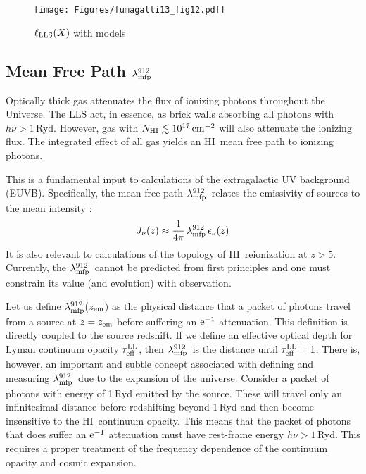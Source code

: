 \documentclass[graybox]{svmult}
\newcommand{\HI}{H{\sc I}}
\newcommand{\mnhi}{N_{\rm HI}}
\def\cm#1{\, {\rm cm^{#1}}}
\def\mlmfp{\lambda_{\rm mfp}^{912}}
\def\lmfp{$\mlmfp$}
\def\mtll{\tau_{\rm eff}^{\rm LL}}
\def\tll{$\mtll$}
\begin{document}
%
\begin{figure}[b]
\sidecaption
\texttt{[image: Figures/fumagalli13\_fig12.pdf]}
%
%
\caption{$\ell_{\rm LLS}(X)$ with models
}
\label{fig:f13_fig12}       %
\end{figure}

\subsection{Mean Free Path \lmfp}

Optically thick gas attenuates the flux of ionizing
photons throughout the Universe.  The LLS act, in essence,
as brick walls absorbing all photons with $h \nu > 1$\,Ryd.
However, gas with $\mnhi \lesssim 10^{17} \cm{-2}$ will
also attenuate the ionizing flux.
The integrated effect of all gas yields an \HI\ mean
free path to ionizing photons.  

This is a fundamental
input to calculations of the extragalactic UV background (EUVB).
Specifically, the mean free path \lmfp\ 
relates the emissivity of sources to the mean intensity
\cite{hm96,fg08}:
\begin{equation}
J_\nu(z) \approx \frac{1}{4 \pi} \, \mlmfp \, \epsilon_\nu(z)
\end{equation}
It is also relevant to calculations of the topology
of \HI\ reionization at $z>5$.
Currently, the \lmfp\
cannot be predicted from first principles
and one must constrain its value (and evolution)
with observation.

Let us define
\lmfp($z_{\rm em}$) as the physical distance that
a packet of photons travel from a source at $z=z_{\rm em}$
before suffering an $\rm e^{-1}$ attenuation.
This definition is directly coupled to the source redshift.
If we define an effective optical depth for Lyman
continuum opacity \tll, then \lmfp\ is the distance until 
$\mtll = 1$.
There is, however, an important and subtle concept associated
with defining and measuring \lmfp\ due to the expansion of the
universe.  Consider a packet of photons with energy of 1\,Ryd
emitted by the source.
These will travel only an infinitesimal distance before
redshifting beyond 1\,Ryd and then become insensitive to the
\HI\ continuum opacity.  This means that the packet of photons
that does suffer an $\rm e^{-1}$ attenuation must have rest-frame
energy $h\nu > 1$\,Ryd.  This requires a proper treatment of
the frequency dependence of the continuum opacity and cosmic
expansion.
\end{document}
